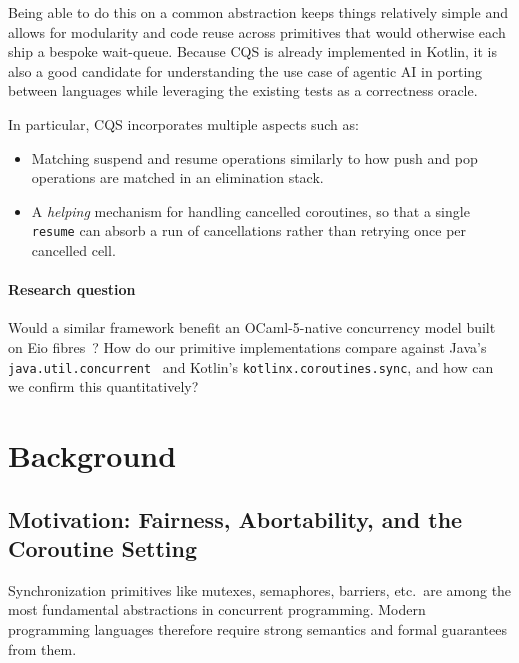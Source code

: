 \documentclass[11pt,a4paper]{article}
\begin{document}
Being able to do this on a common abstraction keeps things relatively
simple and allows for modularity and code reuse across primitives that
would otherwise each ship a bespoke wait-queue. Because CQS is already
implemented in Kotlin, it is also a good candidate for understanding the
use case of agentic AI in porting between languages while leveraging the
existing tests as a correctness oracle.

In particular, CQS incorporates multiple aspects such as:

\begin{itemize}[leftmargin=1.5em,nosep]
  \item Matching suspend and resume operations similarly to how push
        and pop operations are matched in an elimination stack.
  \item A \emph{helping} mechanism for handling cancelled coroutines, so
        that a single \texttt{resume} can absorb a run of cancellations
        rather than retrying once per cancelled cell.
\end{itemize}

\paragraph{Research question}
Would a similar framework benefit an OCaml-5-native concurrency model
built on Eio fibres~\cite{eio}? How do our primitive implementations
compare against Java's \texttt{java.util.concurrent}~\cite{lea2005aqs}
and Kotlin's \texttt{kotlinx.coroutines.sync}, and how can we confirm
this quantitatively?

\section{Background}
\label{sec:background}


\subsection{Motivation: Fairness, Abortability, and the Coroutine Setting}
\label{sec:bg-motivation}

Synchronization primitives like mutexes, semaphores, barriers, etc.\ are
among the most fundamental abstractions in concurrent programming. Modern
programming languages therefore require strong semantics and formal
guarantees from them.
\end{document}
